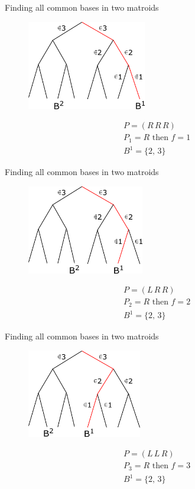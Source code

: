 \documentclass[11pt,xcolor=dvipsnames,table,dvipdfmx]{beamer}
\begin{document}
\begin{frame}{Finding all common bases in two matroids}
 \begin{figure}
  \centering
  \hspace{0.2cm}
  \includegraphics[width=5.2cm]{text4989.png}
 \end{figure}
 \begin{align*}
  &P = (R\,R\,R)\\
  &P_1 = R \text{ then } f = 1\\
  &B^1 = \{2,\,3\}
 \end{align*}
\end{frame}

\begin{frame}{Finding all common bases in two matroids}
 \begin{figure}
  \centering
  \hspace{0.1cm}
  \includegraphics[width=5.1cm]{text4989-2.png}
 \end{figure}
 \begin{align*}
  &P = (L\,R\,R)\\
  &P_2 = R \text{ then } f = 2\\
  &B^1 = \{2,\,3\}
 \end{align*}
\end{frame}

\begin{frame}{Finding all common bases in two matroids}
 \begin{figure}
  \centering
  \hspace{0.03cm}
  \includegraphics[width=5cm]{text4989-3.png}
 \end{figure}
 \begin{align*}
  &P = (L\,L\,R)\\
  &P_3 = R \text{ then } f = 3\\
  &B^1 = \{2,\,3\}
 \end{align*}
\end{frame}
\end{document}
